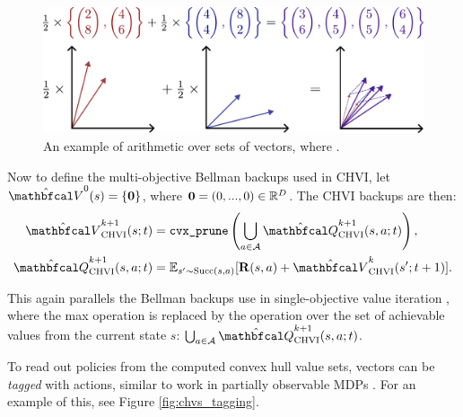         \begin{figure}
            \centering\includegraphics[width=1.0\textwidth]{figures/ch2/ch_arithmetic.pdf} 
            \caption[An example of arithmetic over sets of vectors.]{An example of arithmetic over sets of vectors, where .}
            \label{fig:vectorset_arithmetic}
        \end{figure}

        Now to define the multi-objective Bellman backups used in CHVI, let $\hat{\bfcl{V}}^0(s) = \{ \bff{0} \}$, where $\mathbf{0}=(0,...,0)\in\mathbb{R}^D$. The CHVI backups are then:
        \begin{align}
            \Vchvi^{k+1}(s;t) &= \cprune \left( \bigcup_{a\in\cl{A}} \Qchvi^{k+1}(s,a;t) \right), \\
            \Qchvi^{k+1}(s,a;t) &= \bb{E}_{s'\sim \suc{s}{a}} [\bff{R}(s,a) + \Vchvi^k(s';t+1)].
        \end{align}
        
        This again parallels the Bellman backups use in single-objective value iteration , where the max operation is replaced by the \cprune\ewe operation over the set of achievable values from the current state $s$: $\bigcup_{a\in\cl{A}} \Qchvi^{k+1}(s,a;t)$.

        To read out policies from the computed convex hull value sets, vectors can be \textit{tagged} with actions, similar to work in partially observable MDPs . For an example of this, see Figure \ref{fig:chvs_tagging}.

